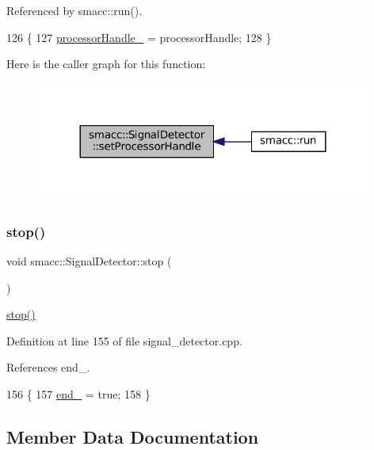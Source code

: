 Referenced by smacc\+::run().


\begin{DoxyCode}
126     \{
127         \hyperlink{classsmacc_1_1SignalDetector_a9a77dc9f0e9f8f56dff5e76077abcb78}{processorHandle\_} = processorHandle;
128     \}
\end{DoxyCode}
Here is the caller graph for this function\+:
\nopagebreak
\begin{figure}[H]
\begin{center}
\leavevmode
\includegraphics[width=312pt]{classsmacc_1_1SignalDetector_ac1197a77c32a3b817005391e550ce646_icgraph}
\end{center}
\end{figure}
\mbox{\label{classsmacc_1_1SignalDetector_a536ea005ea4ef4632c0c9c1c62c557a3}} 
\subsubsection{\texorpdfstring{stop()}{stop()}}
{\footnotesize\ttfamily void smacc\+::\+Signal\+Detector\+::stop (\begin{DoxyParamCaption}{ }\end{DoxyParamCaption})}

\hyperlink{classsmacc_1_1SignalDetector_a536ea005ea4ef4632c0c9c1c62c557a3}{stop()} 

Definition at line 155 of file signal\+\_\+detector.\+cpp.



References end\+\_\+.


\begin{DoxyCode}
156     \{
157         \hyperlink{classsmacc_1_1SignalDetector_aaee266393c01693528a2d74b1f2354a2}{end\_} = \textcolor{keyword}{true};
158     \}
\end{DoxyCode}


\subsection{Member Data Documentation}
\mbox{\label{classsmacc_1_1SignalDetector_aaee266393c01693528a2d74b1f2354a2}} 
